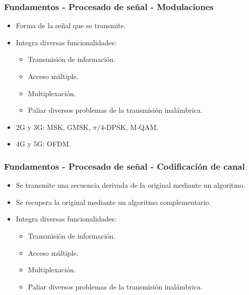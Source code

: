 \documentclass{beamer}
\begin{document}
\begin{frame}
\frametitle{Fundamentos - Procesado de señal - Modulaciones}

\begin{itemize}
\item Forma de la señal que se transmite.
\item {
	Integra diversas funcionalidades:
	\begin{itemize}
	\item Transmisión de información.
	\item Acceso múltiple.
	\item Multiplexación.
	\item Paliar diversos problemas de la transmisión inalámbrica.
	\end{itemize}
}
\item 2G y 3G: MSK, GMSK, $\pi / 4$-DPSK, M-QAM.
\item 4G y 5G: OFDM.
\end{itemize}
\end{frame}

\begin{frame}
\frametitle{Fundamentos - Procesado de señal - Codificación de canal}

\begin{itemize}
\item Se transmite una secuencia derivada de la original mediante un algoritmo.
\item Se recupera la original mediante un algoritmo complementario.
\item {
	Integra diversas funcionalidades:
	\begin{itemize}
	\item Transmisión de información.
	\item Acceso múltiple.
	\item Multiplexación.
	\item Paliar diversos problemas de la transmisión inalámbrica.
	\end{itemize}
}
\end{itemize}
\end{frame}
\end{document}
